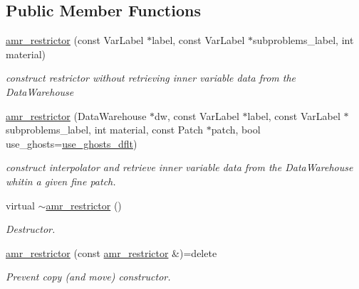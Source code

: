 \subsection*{Public Member Functions}
\begin{DoxyCompactItemize}
\item 
\hyperlink{classUintah_1_1PhaseField_1_1detail_1_1amr__restrictor_3_01ScalarField_3_01T_01_4_00_01Problem_0778720acc9a55f696b8537356a4dbcae_a880d7f565151be8edc8b5b549e0a50ca}{amr\+\_\+restrictor} (const Var\+Label $\ast$label, const Var\+Label $\ast$subproblems\+\_\+label, int material)
\begin{DoxyCompactList}\small\item\em construct restrictor without retrieving inner variable data from the Data\+Warehouse \end{DoxyCompactList}\item 
\hyperlink{classUintah_1_1PhaseField_1_1detail_1_1amr__restrictor_3_01ScalarField_3_01T_01_4_00_01Problem_0778720acc9a55f696b8537356a4dbcae_a0a9a3d33840bf6e095165cc1c3efb729}{amr\+\_\+restrictor} (Data\+Warehouse $\ast$dw, const Var\+Label $\ast$label, const Var\+Label $\ast$subproblems\+\_\+label, int material, const Patch $\ast$patch, bool use\+\_\+ghosts=\hyperlink{classUintah_1_1PhaseField_1_1detail_1_1amr__restrictor_3_01ScalarField_3_01T_01_4_00_01Problem_0778720acc9a55f696b8537356a4dbcae_a4cae73002d40229c69caae07718b94d4}{use\+\_\+ghosts\+\_\+dflt})
\begin{DoxyCompactList}\small\item\em construct interpolator and retrieve inner variable data from the Data\+Warehouse whitin a given fine patch. \end{DoxyCompactList}\item 
virtual \hyperlink{classUintah_1_1PhaseField_1_1detail_1_1amr__restrictor_3_01ScalarField_3_01T_01_4_00_01Problem_0778720acc9a55f696b8537356a4dbcae_a35e91389c93de03bae73b73418a03eec}{$\sim$amr\+\_\+restrictor} ()
\begin{DoxyCompactList}\small\item\em Destructor. \end{DoxyCompactList}\item 
\hyperlink{classUintah_1_1PhaseField_1_1detail_1_1amr__restrictor_3_01ScalarField_3_01T_01_4_00_01Problem_0778720acc9a55f696b8537356a4dbcae_a469b1387fab382992209bf3c0e884df7}{amr\+\_\+restrictor} (const \hyperlink{classUintah_1_1PhaseField_1_1detail_1_1amr__restrictor}{amr\+\_\+restrictor} \&)=delete
\begin{DoxyCompactList}\small\item\em Prevent copy (and move) constructor. \end{DoxyCompactList}\item 

\end{DoxyCompactItemize}

